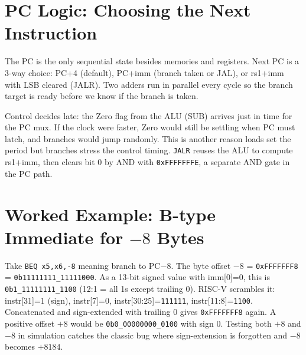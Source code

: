 \section{PC Logic: Choosing the Next Instruction}
The PC is the only sequential state besides memories and registers. Next PC is a 3-way choice: PC+4 (default), PC+imm (branch taken or JAL), or rs1+imm with LSB cleared (JALR). Two adders run in parallel every cycle so the branch target is ready before we know if the branch is taken.

\begin{center}
\end{center}
Control decides late: the Zero flag from the ALU (SUB) arrives just in time for the PC mux. If the clock were faster, Zero would still be settling when PC must latch, and branches would jump randomly. This is another reason loads set the period but branches stress the control timing. \texttt{JALR} reuses the ALU to compute rs1+imm, then clears bit 0 by AND with \texttt{0xFFFFFFFE}, a separate AND gate in the PC path.

\section{Worked Example: B-type Immediate for $-8$ Bytes}
Take \texttt{BEQ x5,x6,-8} meaning branch to PC$-8$. The byte offset $-8$ = \texttt{0xFFFFFFF8} = \texttt{0b11111111\_11111000}. As a 13-bit signed value with imm[0]=0, this is \texttt{0b1\_11111111\_1100} (12:1 = all 1s except trailing 0). RISC-V scrambles it: instr[31]=1 (sign), instr[7]=0, instr[30:25]=\texttt{111111}, instr[11:8]=\texttt{1100}. Concatenated and sign-extended with trailing 0 gives \texttt{0xFFFFFFF8} again. A positive offset $+8$ would be \texttt{0b0\_00000000\_0100} with sign 0. Testing both $+8$ and $-8$ in simulation catches the classic bug where sign-extension is forgotten and $-8$ becomes $+8184$.

